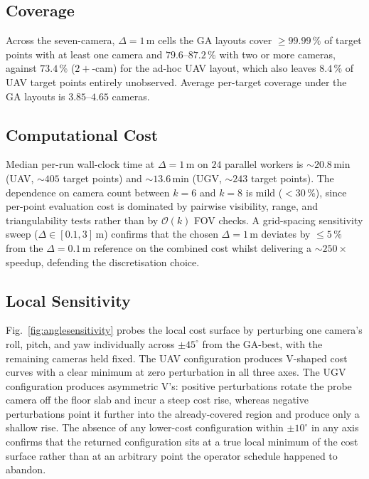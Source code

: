 \documentclass[conference]{IEEEtran}
\begin{document}
\subsection{Coverage}
Across the seven-camera, $\Delta=1\,\text{m}$ cells the GA layouts cover $\geq 99.99\,\%$ of target points with at least one camera and $79.6$--$87.2\,\%$ with two or more cameras, against $73.4\,\%$ ($2+$-cam) for the ad-hoc UAV layout, which also leaves $8.4\,\%$ of UAV target points entirely unobserved. Average per-target coverage under the GA layouts is $3.85$--$4.65$ cameras.

\subsection{Computational Cost}
Median per-run wall-clock time at $\Delta=1\,\text{m}$ on $24$ parallel workers is $\sim 20.8\,\text{min}$ (UAV, $\sim 405$ target points) and $\sim 13.6\,\text{min}$ (UGV, $\sim 243$ target points). The dependence on camera count between $k=6$ and $k=8$ is mild ($<30\,\%$), since per-point evaluation cost is dominated by pairwise visibility, range, and triangulability tests rather than by $\mathcal{O}(k)$ FOV checks. A grid-spacing sensitivity sweep ($\Delta \in [0.1, 3]\,\text{m}$) confirms that the chosen $\Delta=1\,\text{m}$ deviates by $\leq 5\,\%$ from the $\Delta=0.1\,\text{m}$ reference on the combined cost whilst delivering a $\sim 250\times$ speedup, defending the discretisation choice.

\subsection{Local Sensitivity}
Fig.~\ref{fig:anglesensitivity} probes the local cost surface by perturbing one camera's roll, pitch, and yaw individually across $\pm 45^\circ$ from the GA-best, with the remaining cameras held fixed. The UAV configuration produces V-shaped cost curves with a clear minimum at zero perturbation in all three axes. The UGV configuration produces asymmetric V's: positive perturbations rotate the probe camera off the floor slab and incur a steep cost rise, whereas negative perturbations point it further into the already-covered region and produce only a shallow rise. The absence of any lower-cost configuration within $\pm 10^\circ$ in any axis confirms that the returned configuration sits at a true local minimum of the cost surface rather than at an arbitrary point the operator schedule happened to abandon.
\end{document}
